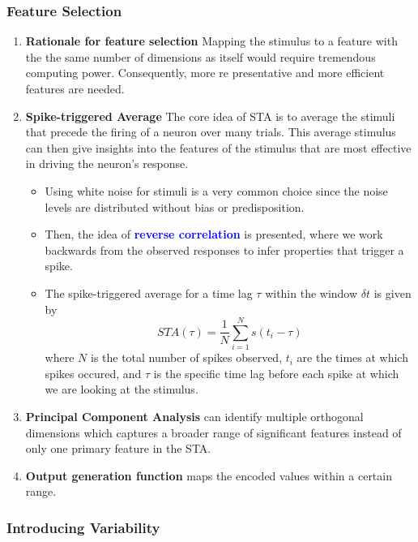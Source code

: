 \documentclass[11pt]{article}
\begin{document}
\subsubsection{Feature Selection}

\begin{enumerate}
    \item \textbf{Rationale for feature selection} Mapping the stimulus to a feature with the the same number of dimensions as itself would require tremendous computing power. Consequently, more re presentative and more efficient features are needed.
    \item \textbf{Spike-triggered Average} The core idea of STA is to average the stimuli that precede the firing of a neuron over many trials. This average stimulus can then give insights into the features of the stimulus that are most effective in driving the neuron's response. 
    \begin{itemize}
        \item Using white noise for stimuli is a very common choice since the noise levels are distributed without bias or predisposition.
        \item Then, the idea of \textcolor{Blue}{\textbf{reverse correlation}} is presented, where we work backwards from the observed responses to infer properties that trigger a spike.
        \item The spike-triggered average for a time lag $\tau$ within the window $\delta t$ is given by \begin{equation*}
            STA(\tau) = \frac{1}{N} \sum_{i=1}^N s(t_i-\tau)
        \end{equation*}
        where $N$ is the total number of spikes observed, $t_i$ are the times at which spikes occured, and $\tau$ is the specific time lag before each spike at which we are looking at the stimulus.
    \end{itemize}
    \item \textbf{Principal Component Analysis} can identify multiple orthogonal dimensions which captures a broader range of significant features instead of only one primary feature in the STA.
    \item \textbf{Output generation function} maps the encoded values within a certain range.
\end{enumerate}

\subsubsection{Introducing Variability}
\end{document}
